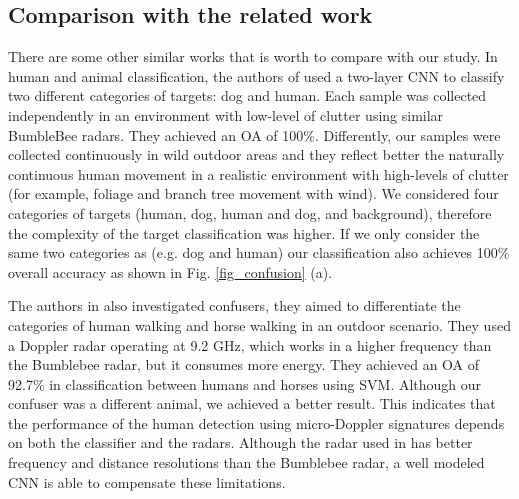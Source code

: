 \subsection{Comparison with the related work}
There are some other similar works that is worth to compare with our study. In human and animal classification, the authors of \cite{lee2017classification} used a two-layer CNN to classify two different categories of targets: dog and human. Each sample was collected independently in an environment with low-level of clutter using similar BumbleBee radars. They achieved an OA of 100\%. Differently, our samples were collected continuously in wild outdoor areas and they reflect better the naturally continuous human movement in a realistic environment with high-levels of clutter (for example, foliage and branch tree movement with wind). We considered four categories of targets (human, dog, human and dog, and background), therefore the complexity of the target classification was higher. If we only consider the same two categories as \cite{lee2017classification} (e.g. dog and human) our classification also achieves 100\% overall accuracy as shown in Fig. \ref{fig_confusion} (a). 

The authors in \cite{miller2013micro} also investigated confusers, they aimed to differentiate the categories of human walking and horse walking in an outdoor scenario. They used a Doppler radar operating at 9.2 GHz, which works in a higher frequency than the Bumblebee radar, but it consumes more energy. They achieved an OA of 92.7\% in classification between humans and horses using SVM. Although our confuser was a different animal, we achieved a better result. This indicates that the performance of the human detection using micro-Doppler signatures depends on both the classifier and the radars. Although the radar used in \cite{miller2013micro} has better frequency and distance resolutions than the Bumblebee radar, a well modeled CNN is able to compensate these limitations.

